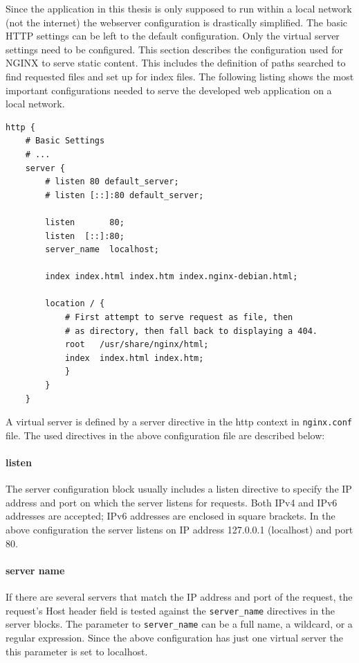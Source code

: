 Since the application in this thesis is only supposed to run within a local network (not the internet) the webserver configuration is drastically simplified. The basic HTTP settings can be left to the default configuration. Only the virtual server settings need to be configured. This section describes the configuration used for NGINX to serve static content. This includes the definition of paths searched to find requested files and set up for index files. The following listing shows the most important configurations needed to serve the developed web application on a local network.

\begin{lstlisting}[caption={Nginx configuration file (nginx.conf)}, 
	label={code:NginxConf}]
http {
	# Basic Settings
	# ...
	server {
		# listen 80 default_server;
		# listen [::]:80 default_server;

		listen       80;
		listen  [::]:80;
		server_name  localhost;

		index index.html index.htm index.nginx-debian.html;

		location / {
			# First attempt to serve request as file, then
			# as directory, then fall back to displaying a 404.
			root   /usr/share/nginx/html;
			index  index.html index.htm;
			}
		}
	}
\end{lstlisting}

A virtual server is defined by a server directive in the http context in \lstinline{nginx.conf} file. The used directives in the above configuration file are described below:

\paragraph{listen} The server configuration block usually includes a listen directive to specify the IP address and port on which the server listens for requests. Both IPv4 and IPv6 addresses are accepted; IPv6 addresses are enclosed in square brackets. In the above configuration the server listens on IP address 127.0.0.1 (localhost) and port 80.

\paragraph{server name} If there are several servers that match the IP address and port of the request, the request’s Host header field is tested against the \lstinline{server_name} directives in the server blocks. The parameter to \lstinline{server_name} can be a full name, a wildcard, or a regular expression. Since the above configuration has just one virtual server the this parameter is set to localhost.

